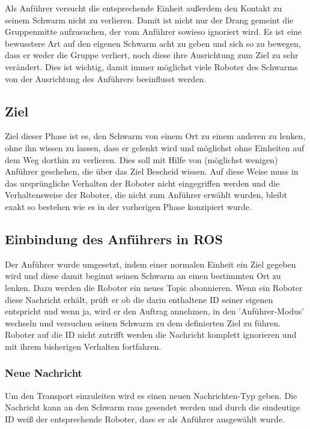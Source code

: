 Als Anführer versucht die entsprechende Einheit außerdem den Kontakt zu seinem Schwarm nicht zu verlieren. Damit ist nicht nur der Drang gemeint die Gruppenmitte aufzusuchen, der vom Anführer sowieso ignoriert wird. Es ist eine bewusstere Art auf den eigenen Schwarm acht zu geben und sich so zu bewegen, dass er weder die Gruppe verliert, noch diese ihre Ausrichtung zum Ziel zu sehr verändert. Dies ist wichtig, damit immer möglichst viele Roboter des Schwarms von der Ausrichtung des Anführers beeinflusst werden.

\subsection*{Ziel}

Ziel dieser Phase ist es, den Schwarm von einem Ort zu einem anderen zu lenken, ohne ihn wissen zu lassen, dass er gelenkt wird und möglichst ohne Einheiten auf dem Weg dorthin zu verlieren. Dies soll mit Hilfe von (möglichst wenigen) Anführer geschehen, die über das Ziel Bescheid wissen. Auf diese Weise muss in das ursprüngliche Verhalten der Roboter nicht eingegriffen werden und die Verhaltensweise der Roboter, die nicht zum Anführer erwählt wurden, bleibt exakt so bestehen wie es in der vorherigen Phase konzipiert wurde.

\subsection*{Einbindung des Anführers in ROS}

Der Anführer wurde umgesetzt, indem einer normalen Einheit ein Ziel gegeben wird und diese damit beginnt seinen Schwarm an einen bestimmten Ort zu lenken. Dazu werden die Roboter ein neues Topic abonnieren. Wenn ein Roboter diese Nachricht erhält, prüft er ob die darin enthaltene ID seiner eigenen entspricht und wenn ja, wird er den Auftrag annehmen, in den 'Anführer-Modus' wechseln und versuchen seinen Schwarm zu dem definierten Ziel zu führen. Roboter auf die ID nicht zutrifft werden die Nachricht komplett ignorieren und mit ihrem bisherigen Verhalten fortfahren.

\subsubsection*{Neue Nachricht}

Um den Transport einzuleiten wird es einen neuen Nachrichten-Typ geben. Die Nachricht kann an den Schwarm raus gesendet werden und durch die eindeutige ID weiß der entsprechende Roboter, dass er als Anführer ausgewählt wurde.

